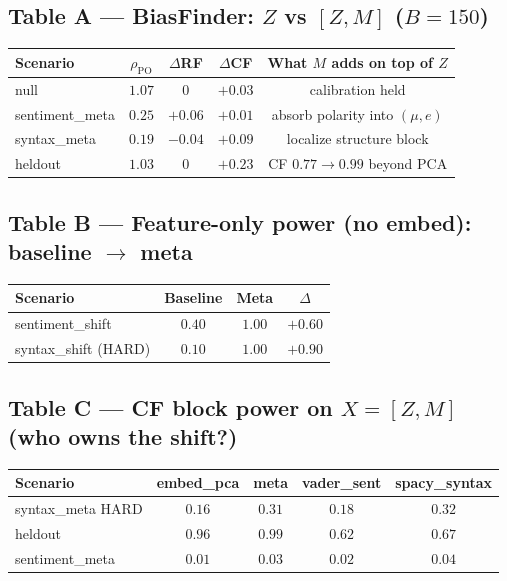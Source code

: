 \documentclass[11pt]{article}
\begin{document}
\subsection*{Table A --- BiasFinder: $Z$ vs $[Z,M]$ ($B{=}150$)}
\begin{center}
\begin{tabular}{lcccc}
\toprule
Scenario & $\rho_{\mathrm{PO}}$ & $\Delta$RF
  & $\Delta$CF & What $M$ adds on top of $Z$ \\
\midrule
null & $1.07$ & $0$ & $+0.03$ & calibration held \\
sentiment\_meta & $\mathbf{0.25}$ & $+0.06$ & $+0.01$
  & absorb polarity into $(\mu,e)$ \\
syntax\_meta & $\mathbf{0.19}$ & $-0.04$ & $\mathbf{+0.09}$
  & localize structure block \\
heldout & $1.03$ & $0$ & $\mathbf{+0.23}$
  & CF $0.77\!\to\!0.99$ beyond PCA \\
\bottomrule
\end{tabular}
\end{center}

\subsection*{Table B --- Feature-only power (no embed): baseline $\to$ meta}
\begin{center}
\begin{tabular}{lccc}
\toprule
Scenario & Baseline & Meta & $\Delta$ \\
\midrule
sentiment\_shift & $0.40$ & $\mathbf{1.00}$ & $+0.60$ \\
syntax\_shift (HARD) & $0.10$ & $\mathbf{1.00}$ & $+0.90$ \\
\bottomrule
\end{tabular}
\end{center}

\subsection*{Table C --- CF block power on $X{=}[Z,M]$ (who owns the shift?)}
\begin{center}
\small
\begin{tabular}{lcccc}
\toprule
Scenario & embed\_pca & meta & vader\_sent & spacy\_syntax \\
\midrule
syntax\_meta HARD & $0.16$ & $\mathbf{0.31}$ & $0.18$ & $\mathbf{0.32}$ \\
heldout & $0.96$ & $\mathbf{0.99}$ & $0.62$ & $0.67$ \\
sentiment\_meta & $0.01$ & $0.03$ & $0.02$ & $0.04$ \\
\bottomrule
\end{tabular}
\end{center}
\end{document}
